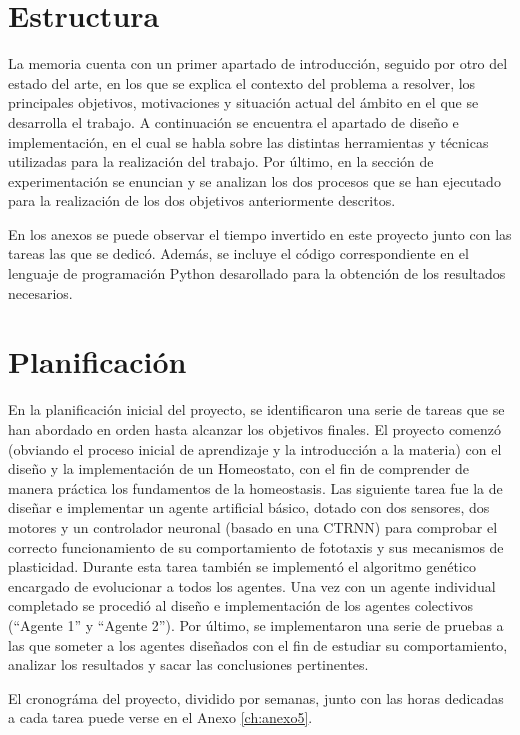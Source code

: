 \section{Estructura}
La memoria cuenta con un primer apartado de introducción, seguido por otro del estado del arte, en los que se explica el contexto del problema a resolver, los principales objetivos,
motivaciones y situación actual del ámbito en el que se desarrolla el trabajo. A continuación se encuentra el apartado de diseño e implementación, en el cual se habla sobre las distintas
herramientas y técnicas utilizadas para la realización del trabajo. Por último, en la sección de experimentación se enuncian y se analizan los dos procesos que se han ejecutado para la
realización de los dos objetivos anteriormente descritos.

En los anexos se puede observar el tiempo invertido en este proyecto junto con las tareas las que se dedicó. Además,
se incluye el código correspondiente en el lenguaje de programación Python desarollado para la obtención de los resultados necesarios.

\section{Planificación}

En la planificación inicial del proyecto, se identificaron una serie de tareas que se han abordado en orden hasta alcanzar los objetivos finales. El proyecto comenzó (obviando el proceso inicial de aprendizaje y la introducción a la materia) con
el diseño y la implementación de un Homeostato, con el fin de comprender de manera práctica los fundamentos de la homeostasis. Las siguiente tarea fue la de diseñar e implementar un agente artificial básico, dotado con dos sensores, dos motores y un controlador
neuronal (basado en una CTRNN) para  comprobar el correcto funcionamiento de su comportamiento de fototaxis y sus mecanismos de plasticidad. Durante esta tarea también se implementó el algoritmo genético encargado de evolucionar a todos los agentes. Una vez con un agente individual
completado se procedió al diseño e implementación de los agentes colectivos (``Agente 1'' y ``Agente 2''). Por último, se implementaron una serie de pruebas a las que someter a los agentes diseñados con el fin de estudiar su comportamiento, analizar los resultados y sacar las conclusiones
pertinentes.

El cronográma del proyecto, dividido por semanas, junto con las horas dedicadas a cada tarea puede verse en el Anexo \ref{ch:anexo5}.
